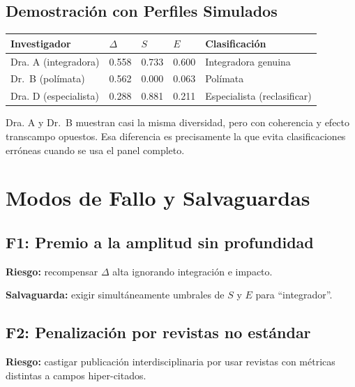 \documentclass[
]{article}
\begin{document}
\hypertarget{demostraciuxf3n-con-perfiles-simulados}{%
\subsection{Demostración con Perfiles
Simulados}\label{demostraciuxf3n-con-perfiles-simulados}}

\begin{longtable}[]{@{}lllll@{}}
\toprule
Investigador & \(\Delta\) & \(S\) & \(E\) & Clasificación \\
\midrule
\endhead
Dra. A (integradora) & 0.558 & 0.733 & 0.600 & Integradora genuina \\
Dr.~B (polímata) & 0.562 & 0.000 & 0.063 & Polímata \\
Dra. D (especialista) & 0.288 & 0.881 & 0.211 & Especialista
(reclasificar) \\
\bottomrule
\end{longtable}

Dra. A y Dr.~B muestran casi la misma diversidad, pero con coherencia y
efecto transcampo opuestos. Esa diferencia es precisamente la que evita
clasificaciones erróneas cuando se usa el panel completo.

\hypertarget{modos-de-fallo-y-salvaguardas}{%
\section{Modos de Fallo y
Salvaguardas}\label{modos-de-fallo-y-salvaguardas}}

\hypertarget{f1-premio-a-la-amplitud-sin-profundidad}{%
\subsection{F1: Premio a la amplitud sin
profundidad}\label{f1-premio-a-la-amplitud-sin-profundidad}}

\textbf{Riesgo:} recompensar \(\Delta\) alta ignorando integración e
impacto.

\textbf{Salvaguarda:} exigir simultáneamente umbrales de \(S\) y \(E\)
para ``integrador''.

\hypertarget{f2-penalizaciuxf3n-por-revistas-no-estuxe1ndar}{%
\subsection{F2: Penalización por revistas no
estándar}\label{f2-penalizaciuxf3n-por-revistas-no-estuxe1ndar}}

\textbf{Riesgo:} castigar publicación interdisciplinaria por usar
revistas con métricas distintas a campos hiper-citados.
\end{document}
